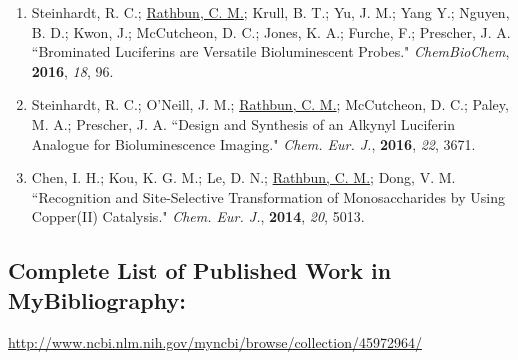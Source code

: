 \documentclass{nihbiosketch}
\begin{document}
\begin{enumerate}
\begin{enumerate}
  \item Steinhardt, R. C.; \underline{Rathbun, C. M.}; Krull, B. T.; Yu, J. M.; Yang Y.; Nguyen, B. D.; Kwon, J.; McCutcheon, D. C.; Jones, K. A.; Furche, F.; Prescher, J. A. ``Brominated Luciferins are Versatile Bioluminescent Probes." \textit{ChemBioChem}, \textbf{2016}, \textit{18}, 96. %

  \item Steinhardt, R. C.; O'Neill, J. M.; \underline{Rathbun, C. M.}; McCutcheon, D. C.; Paley, M. A.; Prescher, J. A. ``Design and Synthesis of an Alkynyl Luciferin Analogue for Bioluminescence Imaging." \textit{Chem. Eur. J.}, \textbf{2016}, \textit{22}, 3671.

  \item Chen, I. H.; Kou, K. G. M.; Le, D. N.; \underline{Rathbun, C. M.}; Dong, V. M. ``Recognition and Site-Selective Transformation of Monosaccharides by Using Copper(II) Catalysis." \textit{Chem. Eur. J.}, \textbf{2014}, \textit{20}, 5013. %

\end{enumerate}

\end{enumerate}

\subsection*{Complete List of Published Work in MyBibliography:}
\url{http://www.ncbi.nlm.nih.gov/myncbi/browse/collection/45972964/} %


\end{document}
